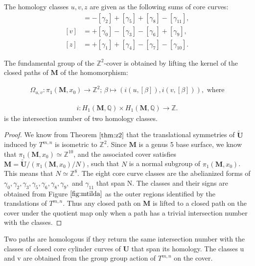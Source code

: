 \documentclass[]{article}
\begin{document}
\begin{Def}
The homology classes $u,v,z$ are given as the following sums of core curves:
\begin{align*}
[u] &= -[\gamma_2] +[\gamma_5] + [\gamma_8] - [\gamma_{11}],\\
[v] &= +[\gamma_0] -[\gamma_3] -[\gamma_6] +[\gamma_9],\\
[z] &= +[\gamma_1] +[\gamma_4]-[\gamma_7]-[\gamma_{10}].
\end{align*}
\end{Def}

\begin{thm}
The fundamental group of the $\mathbb{Z}^2$-cover is obtained by lifting the kernel of the closed paths of $\mathbf{M}$ of the homomorphism:

\begin{align*}
\Omega_{u,v}:\pi_1(\mathbf{M},x_0)\rightarrow \mathbb{Z}^2 \text{; } \beta\mapsto(i(u,[\beta]),i(v,[\beta])),\text{ where}
\end{align*}

\begin{align*}
i:H_1(\mathbf{M},\mathbb Q)\times H_1(\mathbf{M},\mathbb Q)\rightarrow \mathbb Z.
\end{align*}is the intersection number of two homology classes.
\begin{proof}
We know from Theorem $\ref{thm:z2}$ that the translational symmetries of $\tilde{\mathbf{U}}$ induced by $T^{m,n}$ is isometric to $\mathbb{Z}^2$. Since $\mathbf{M}$ is a genus 5 base surface, we know that $\pi_1(\mathbf{M},x_0)\simeq \mathbb{Z}^{10}$, and the associated cover satisfies $\mathbf{M}=\tilde{\mathbf{U}}/(\pi_1(\mathbf{M},x_0)/N)$, such that $N$ is a normal subgroup of $\pi_1(\mathbf{M},x_0)$. This means that $N\simeq \mathbb{Z}^8$. The eight core curve classes are the abelianized forms of  $\gamma_0,\gamma_2,\gamma_3,\gamma_5,\gamma_6,\gamma_8,\gamma_9,$ and $\gamma_{11}$ that span N. The classes and their signs are obtained from Figure $\ref{fig:mtilda}$ as the outer regions identified by the translations of $T^{m,n}$. Thus any closed path on $\mathbf{M}$ is lifted to a closed path on the cover under the quotient map only when a path has a trivial intersection number with the classes.
\end{proof}

\end{thm}
Two paths are homologous if they return the same intersection number with the classes of closed core cylinder curves of $\mathbf{U}$ that span its homology. The classes u and v are obtained from the group group action of $T^{m,n}$ on the cover.
\end{document}

